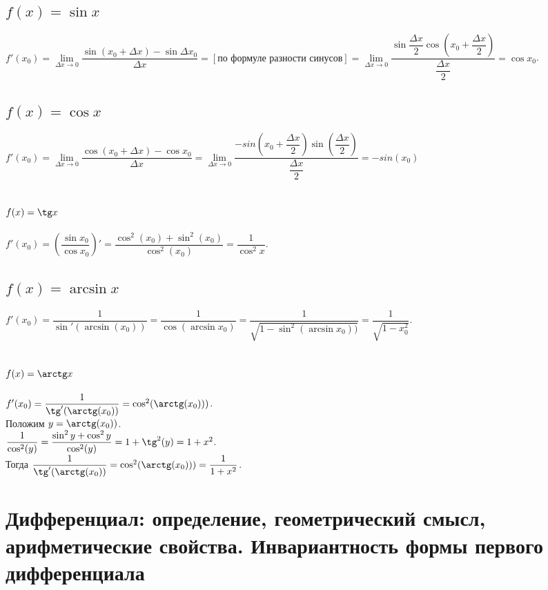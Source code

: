 \documentclass{article}
\begin{document}
\subsection{$f(x) = \sin x$}
$f'(x_0) = \lim\limits_{\Delta x\to 0}\dfrac{\sin(x_0 + \Delta x) - \sin\Delta x_0}{\Delta x} = [\textrm{по формуле разности синусов}] = \lim\limits_{\Delta x\to 0} \dfrac{\sin\dfrac{\Delta x}{2}\cos\left(x_0 + \dfrac{\Delta x}{2}\right)}{\dfrac{\Delta x}{2}} = \cos x_0$.
 
\subsection{$f(x) = \cos x$}
$f'(x_0) = \lim\limits_{\Delta x\to 0} \dfrac{\cos(x_0 + \Delta x) - \cos x_0}{\Delta x} = \lim\limits_{\Delta x\to 0} \dfrac{-sin(x_0 + \dfrac{\Delta x}{2})\sin\left(\dfrac{\Delta x}{2}\right)}{\dfrac{\Delta x
}{2}} = -sin(x_0)$
 
\subsection{$f(x) = \tg x$}
$f'(x_0) = \left(\dfrac{\sin x_0}{\cos x_0}\right)' = \dfrac{\cos^2(x_0) + \sin^2(x_0)}{\cos^2(x_0)} = \dfrac{1}{\cos^2 x}$.
 
\subsection{$f(x) = \arcsin x$}
$f'(x_0) = \dfrac{1}{\sin'(\arcsin (x_0))} = \dfrac{1}{\cos(\arcsin x_0)} = \dfrac{1}{\sqrt{1 - \sin^2(\arcsin x_0))}} = \dfrac{1}{\sqrt{1 - x_0^2}}$.
 
\subsection{$f(x) = \arctg x$}
 
$f'(x_0) = \dfrac{1}{\tg'(\arctg(x_0))} = \cos^2(\arctg(x_0)))$. \\
Положим $y = \arctg(x_0))$. \\
$\dfrac{1}{\cos^2(y)} = \dfrac{\sin^2 y + \cos^2 y}{\cos^2(y)} = 1 + \tg^2(y) = 1 + x^2$. \\
Тогда $\dfrac{1}{\tg'(\arctg(x_0))} = \cos^2(\arctg(x_0))) = \dfrac{1}{1 + x^2}$.
 
\bigskip\bigskip
\section{Дифференциал: определение, геометрический смысл, арифметические свойства. Инвариантность формы первого дифференциала}
 
\end{document}
